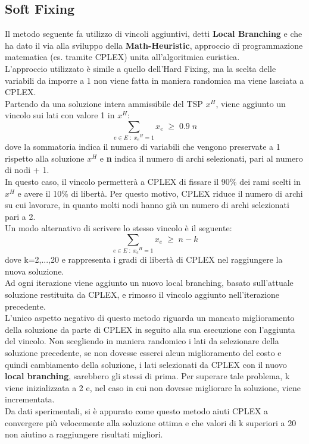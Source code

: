 \subsection{Soft Fixing}\label{soft fixing}
Il metodo seguente fa utilizzo di vincoli aggiuntivi, detti \textbf{Local Branching} e che ha dato il via alla sviluppo della \textbf{Math-Heuristic}, approccio di programmazione matematica (es. tramite CPLEX) unita all'algoritmica euristica\cite{local_branching}.\\
L'approccio utilizzato è simile a quello dell'Hard Fixing, ma la scelta delle variabili da imporre a 1 non viene fatta in maniera randomica ma viene lasciata a CPLEX.\\
Partendo da una soluzione intera ammissibile del TSP $x^H$, viene aggiunto un vincolo sui lati con valore 1 in $x^H$:\\
$$\underset{e\in E\; : \; {x_e}^{H}=1}\sum{x_e}\;\geq\; 0.9\;n$$
dove la sommatoria indica il numero di variabili che vengono preservate a 1 rispetto alla soluzione $x^H$ e \textbf{n} indica il numero di archi selezionati, pari al numero di nodi + 1.\\
In questo caso, il vincolo permetterà a CPLEX di fissare il 90\% dei rami scelti in $x^H$ e avere il 10\% di libertà. Per questo motivo, CPLEX riduce il numero di archi su cui lavorare, in quanto molti nodi hanno già un numero di archi selezionati pari a 2.\\
Un modo alternativo di scrivere lo stesso vincolo è il seguente:
$$\underset{e\in E\; : \; {x_e}^{H}=1}\sum{x_e}\;\geq\; n-k$$
dove k=2,...,20 e rappresenta i gradi di libertà di CPLEX nel raggiungere la nuova soluzione.\\
Ad ogni iterazione viene aggiunto un nuovo local branching, basato sull'attuale soluzione restituita da CPLEX, e rimosso il vincolo aggiunto nell'iterazione precedente.\\
L'unico aspetto negativo di questo metodo riguarda un mancato miglioramento della soluzione da parte di CPLEX in seguito alla sua esecuzione con l'aggiunta del vincolo. Non scegliendo in maniera randomico i lati da selezionare della soluzione precedente, se non dovesse esserci alcun miglioramento del costo e quindi cambiamento della soluzione, i lati selezionati da CPLEX  con il nuovo \textbf{local branching}, sarebbero gli stessi di prima. Per superare tale problema, k viene inizializzata a 2 e, nel caso in cui non dovesse migliorare la soluzione, viene incrementata.\\
Da dati sperimentali, si è appurato come questo metodo aiuti CPLEX a convergere più velocemente alla soluzione ottima e che valori di k superiori a 20 non aiutino a raggiungere risultati migliori.\\
